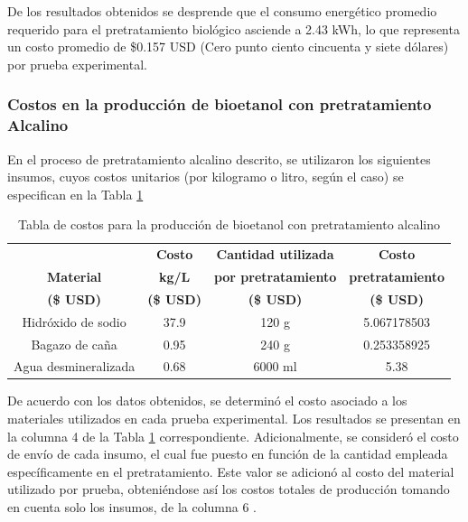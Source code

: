 \documentclass[12pt]{article}
\begin{document}
	
De los resultados obtenidos se desprende que el consumo energético promedio requerido para el pretratamiento biológico asciende a 2.43 kWh, lo que representa un costo promedio de \$0.157 USD (Cero punto ciento cincuenta y siete dólares) por prueba experimental.

	
		\subsubsection{Costos en la producción de bioetanol con pretratamiento Alcalino }
	
	En el proceso de pretratamiento alcalino descrito, se utilizaron los siguientes insumos, cuyos costos unitarios (por kilogramo o litro, según el caso) se especifican en la Tabla \ref{Costo para pretratamiento alcalino}
	
	
	
	\begin{table}[H]
		\centering
		\caption{Tabla de costos para la producción de bioetanol con pretratamiento alcalino}
		\label{Costo para pretratamiento alcalino}
		\setlength{\tabcolsep}{2.5pt}
		\begin{tabular}{|c|c|c|c|}
			\hline
			& \textbf{Costo}& \textbf{Cantidad utilizada }  & \textbf{ Costo} \\
			\textbf{Material}&	\textbf{kg/L} & 	\textbf{por pretratamiento}& \textbf{pretratamiento} \\ 
			\textbf{(\$ USD) }		& \textbf{(\$ USD)} &\textbf{	(\$ USD) }& \textbf{	(\$ USD) }\\ \hline		
			Hidróxido de sodio&37.9& 120 g&5.067178503 \\ \hline
			Bagazo de caña 	  &0.95& 240 g &  0.253358925 \\ \hline
			Agua desmineralizada&0.68& 6000 ml  & 5.38 \\ \hline
		\end{tabular} 
		
		
	\end{table}
	De acuerdo con los datos obtenidos, se determinó el costo asociado a los materiales utilizados en cada prueba experimental. Los resultados se presentan en la columna 4 de la Tabla \ref{Costo para pretratamiento alcalino} correspondiente. Adicionalmente, se consideró el costo de envío de cada insumo, el cual fue puesto en función de la cantidad empleada específicamente en el pretratamiento. Este valor se adicionó al costo del material utilizado por prueba, obteniéndose así los costos totales de producción tomando en cuenta solo los insumos, de la columna 6 .
\end{document}

